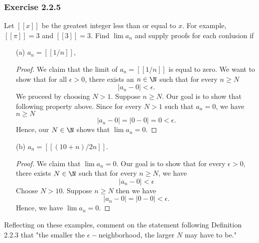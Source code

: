 \subsubsection{Exercise 2.2.5} 
Let \( [[x]] \) be the greatest integer less than or equal to \( x \). For example, \( [[\pi]] = 3  \) and \( [[3]] = 3 \). Find \( \lim a_n \) and supply proofs for each conlusion if  
\begin{enumerate}
    \item[(a)] \( a_n = [[ 1/n ]]\),
    \begin{proof}
        We claim that the limit of \( a_n = [[ 1 / n ]]\) is equal to zero. We want to show that 
        for all \( \epsilon  > 0 \), there exists an \( n \in \N \) such that for every \( n \geq N \) \[ | a_n - 0 | < \epsilon. \]
        We proceed by choosing \( N > 1 \). Suppose \( n \geq N \). Our goal is to show that following property above. Since for every \( N > 1 \) such that \( a_n = 0 \), we have \( n \geq N \) \[ | a_n - 0 | = | 0 - 0 | = 0 < \epsilon  .\] 
        Hence, our \( N \in \N \) shows that \( \lim a_n =0\).
    \end{proof}
    \item [(b)] \(a_n =  [[ (10+n) / 2n]]\).
        \begin{proof}
        We claim that \( \lim a_n = 0 \). Our goal is to show that for every \( \epsilon  > 0 \), there exists \( N \in \N \) such that for every \( n \geq N \), we have  
        \[ |a_n - 0 | < \epsilon \]
        Choose \( N > 10\). Suppose \( n \geq N \) then we have 
    \[ | a_n - 0 | = |0 - 0| < \epsilon.\]
        Hence, we have \( \lim a_n = 0 \).
        \end{proof}
\end{enumerate}
Reflecting on these examples, comment on the statement following Definition 2.2.3 that "the smaller the \(\epsilon-\)neighborhood, the larger \( N \) may have to be."

